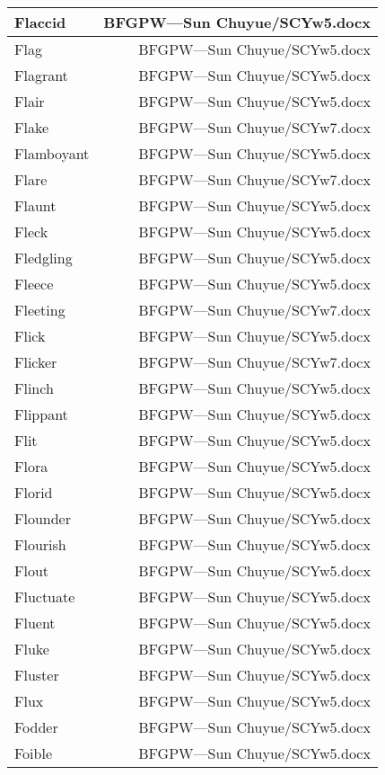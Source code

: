 \documentclass{article}
\begin{document}
\begin{center}
\begin{longtable}{|l|r|}
\hline
Flaccid  &  BFGPW---Sun Chuyue/SCYw5.docx\\  
\hline
Flag  &  BFGPW---Sun Chuyue/SCYw5.docx\\  
\hline
Flagrant  &  BFGPW---Sun Chuyue/SCYw5.docx\\  
\hline
Flair  &  BFGPW---Sun Chuyue/SCYw5.docx\\  
\hline
Flake  &  BFGPW---Sun Chuyue/SCYw7.docx\\  
\hline
Flamboyant  &  BFGPW---Sun Chuyue/SCYw5.docx\\  
\hline
Flare  &  BFGPW---Sun Chuyue/SCYw7.docx\\  
\hline
Flaunt  &  BFGPW---Sun Chuyue/SCYw5.docx\\  
\hline
Fleck  &  BFGPW---Sun Chuyue/SCYw5.docx\\  
\hline
Fledgling  &  BFGPW---Sun Chuyue/SCYw5.docx\\  
\hline
Fleece  &  BFGPW---Sun Chuyue/SCYw5.docx\\  
\hline
Fleeting  &  BFGPW---Sun Chuyue/SCYw7.docx\\  
\hline
Flick  &  BFGPW---Sun Chuyue/SCYw5.docx\\  
\hline
Flicker  &  BFGPW---Sun Chuyue/SCYw7.docx\\  
\hline
Flinch  &  BFGPW---Sun Chuyue/SCYw5.docx\\  
\hline
Flippant  &  BFGPW---Sun Chuyue/SCYw5.docx\\  
\hline
Flit  &  BFGPW---Sun Chuyue/SCYw5.docx\\  
\hline
Flora  &  BFGPW---Sun Chuyue/SCYw5.docx\\  
\hline
Florid  &  BFGPW---Sun Chuyue/SCYw5.docx\\  
\hline
Flounder  &  BFGPW---Sun Chuyue/SCYw5.docx\\  
\hline
Flourish  &  BFGPW---Sun Chuyue/SCYw5.docx\\  
\hline
Flout  &  BFGPW---Sun Chuyue/SCYw5.docx\\  
\hline
Fluctuate  &  BFGPW---Sun Chuyue/SCYw5.docx\\  
\hline
Fluent  &  BFGPW---Sun Chuyue/SCYw5.docx\\  
\hline
Fluke  &  BFGPW---Sun Chuyue/SCYw5.docx\\  
\hline
Fluster  &  BFGPW---Sun Chuyue/SCYw5.docx\\  
\hline
Flux  &  BFGPW---Sun Chuyue/SCYw5.docx\\  
\hline
Fodder  &  BFGPW---Sun Chuyue/SCYw5.docx\\  
\hline
Foible  &  BFGPW---Sun Chuyue/SCYw5.docx\\  

\end{longtable}
\end{center}
\end{document}
